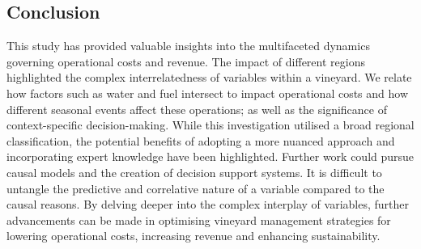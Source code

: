 \documentclass[review,12pt,authoryear]{elsarticle}
\begin{document}
\begin{linenumbers}
\fi

\section{Conclusion}

This study has provided valuable insights into the multifaceted dynamics governing operational costs and revenue. The impact of different regions highlighted the complex interrelatedness of variables within a vineyard. We relate how factors such as water and fuel intersect to impact operational costs and how different seasonal events affect these operations; as well as the significance of context-specific decision-making. While this investigation utilised a broad regional classification, the potential benefits of adopting a more nuanced approach and incorporating expert knowledge have been highlighted. Further work could pursue causal models and the creation of decision support systems. It is difficult to untangle the predictive and correlative nature of a variable compared to the causal reasons. By delving deeper into the complex interplay of variables, further advancements can be made in optimising vineyard management strategies for lowering operational costs, increasing revenue and enhancing sustainability.






\end{linenumbers}
\end{document}
